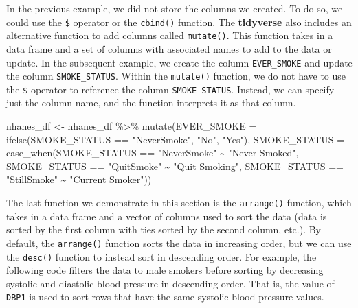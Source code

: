 \documentclass[
  letterpaper,
]{latex/krantz}
\makeatletter
\newenvironment{Shaded}{\begin{snugshade}}{\end{snugshade}}
\newcommand{\AttributeTok}[1]{\textcolor[rgb]{0.40,0.45,0.13}{#1}}
\newcommand{\FunctionTok}[1]{\textcolor[rgb]{0.28,0.35,0.67}{#1}}
\newcommand{\NormalTok}[1]{\textcolor[rgb]{0.00,0.23,0.31}{#1}}
\newcommand{\OtherTok}[1]{\textcolor[rgb]{0.00,0.23,0.31}{#1}}
\newcommand{\SpecialCharTok}[1]{\textcolor[rgb]{0.37,0.37,0.37}{#1}}
\newcommand{\StringTok}[1]{\textcolor[rgb]{0.13,0.47,0.30}{#1}}
\newenvironment{kframe}{%
\medskip{}
\setlength{\fboxsep}{.8em}
 \def\at@end@of@kframe{}%
 \ifinner\ifhmode%
  \def\at@end@of@kframe{\end{minipage}}%
  \begin{minipage}{\columnwidth}%
 \fi\fi%
 \def\FrameCommand##1{\hskip\@totalleftmargin \hskip-\fboxsep
 \colorbox{shadecolor}{##1}\hskip-\fboxsep
     \hskip-\linewidth \hskip-\@totalleftmargin \hskip\columnwidth}%
 \MakeFramed {\advance\hsize-\width
   \@totalleftmargin\z@ \linewidth\hsize
   \@setminipage}}%
 {\par\unskip\endMakeFramed%
 \at@end@of@kframe}
\renewenvironment{Shaded}{\begin{kframe}}{\end{kframe}}
\makeatother
\begin{document}
In the previous example, we did not store the columns we created. To do
so, we could use the \texttt{\$} operator or the \texttt{cbind()}
function. The \textbf{tidyverse} also includes an alternative function
to add columns called
\texttt{mutate()}. This
function takes in a data frame and a set of columns with associated
names to add to the data or update. In the subsequent example, we create
the column \texttt{EVER\_SMOKE} and update the column
\texttt{SMOKE\_STATUS}. Within the \texttt{mutate()} function, we do not
have to use the \texttt{\$} operator to reference the column
\texttt{SMOKE\_STATUS}. Instead, we can specify just the column name,
and the function interprets it as that column.

\begin{Shaded}
\begin{Highlighting}[]
\NormalTok{nhanes\_df }\OtherTok{\textless{}{-}}\NormalTok{ nhanes\_df }\SpecialCharTok{\%\textgreater{}\%} 
  \FunctionTok{mutate}\NormalTok{(}\AttributeTok{EVER\_SMOKE =} \FunctionTok{ifelse}\NormalTok{(SMOKE\_STATUS }\SpecialCharTok{==} \StringTok{"NeverSmoke"}\NormalTok{, }
                             \StringTok{"No"}\NormalTok{, }\StringTok{"Yes"}\NormalTok{), }
         \AttributeTok{SMOKE\_STATUS =} 
           \FunctionTok{case\_when}\NormalTok{(SMOKE\_STATUS }\SpecialCharTok{==} \StringTok{"NeverSmoke"} \SpecialCharTok{\textasciitilde{}} \StringTok{"Never Smoked"}\NormalTok{,}
\NormalTok{                     SMOKE\_STATUS }\SpecialCharTok{==} \StringTok{"QuitSmoke"} \SpecialCharTok{\textasciitilde{}} \StringTok{"Quit Smoking"}\NormalTok{,}
\NormalTok{                     SMOKE\_STATUS }\SpecialCharTok{==} \StringTok{"StillSmoke"} \SpecialCharTok{\textasciitilde{}} \StringTok{"Current Smoker"}\NormalTok{)) }
\end{Highlighting}
\end{Shaded}

The last function we demonstrate in this section is the
\texttt{arrange()}
function, which takes in a data frame and a vector of columns used to
sort the data (data is sorted by the first column with ties sorted by
the second column, etc.). By default, the \texttt{arrange()} function
sorts the data in increasing order, but we can use the \texttt{desc()}
function to instead sort in descending order. For example, the following
code filters the data to male smokers before sorting by decreasing
systolic and diastolic blood pressure in descending order. That is, the
value of \texttt{DBP1} is used to sort rows that have the same systolic
blood pressure values.
\end{document}
